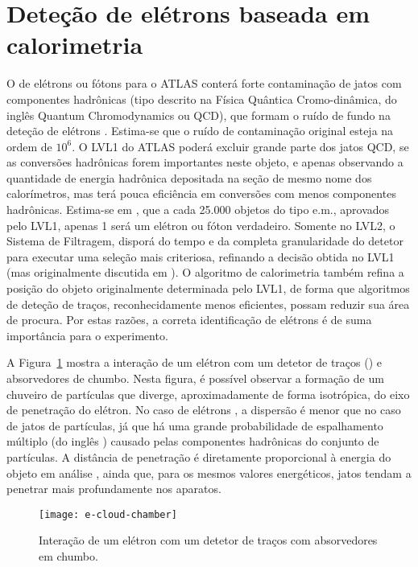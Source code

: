 \section{Deteção de elétrons baseada em calorimetria}
\label{sec:e-detection}

O  de elétrons ou fótons para o ATLAS conterá forte contaminação
de jatos com componentes hadrônicas (tipo descrito na Física Quântica
Cromo-dinâmica, do inglês Quantum Chromodynamics ou QCD), que formam o ruído
de fundo na deteção de elétrons \cite{nevski-calor-1992}. Estima-se que o
ruído de contaminação original esteja na ordem de $10^6$. O LVL1 do ATLAS poderá
excluir grande parte dos jatos QCD, se as conversões hadrônicas forem
importantes neste objeto, e apenas observando a quantidade de energia
hadrônica depositada na seção de mesmo nome dos calorímetros, mas terá pouca
eficiência em conversões com menos componentes hadrônicas. Estima-se em
\cite{daqnote00-02}, que a cada 25.000 objetos do tipo e.m., aprovados pelo
LVL1, apenas 1 será um elétron ou fóton verdadeiro. Somente no LVL2, o Sistema
de Filtragem, disporá do tempo e da completa granularidade do detetor para
executar uma seleção mais criteriosa, refinando a decisão obtida no LVL1
\cite{hlt-tdr} (mas originalmente discutida em \cite{ellis-calor-1992}). O
algoritmo de calorimetria também refina a posição do objeto originalmente
determinada pelo LVL1, de forma que algoritmos de deteção de traços,
reconhecidamente menos eficientes, possam reduzir sua área de procura. Por
estas razões, a correta identificação de elétrons é de suma importância para o
experimento.

A Figura~\ref{fig:e-shower} mostra a interação de um elétron com um detetor de
traços () e absorvedores de chumbo. Nesta figura, é
possível observar a formação de um chuveiro de partículas que diverge,
aproximadamente de forma isotrópica, do eixo de penetração do elétron. No caso
de elétrons \cite{wigmans-book}, a dispersão é menor que no caso de jatos de
partículas, já que há uma grande probabilidade de espalhamento múltiplo (do
inglês ) causado pelas componentes hadrônicas do
conjunto de partículas. A distância de penetração é diretamente proporcional à
energia do objeto em análise \cite{leo, knoll}, ainda que, para os mesmos
valores energéticos, jatos tendam a penetrar mais profundamente nos aparatos.

\begin{figure}
\begin{center}
\texttt{[image: e-cloud-chamber]}
\end{center}
\caption{Interação de um elétron com um detetor de traços com absorvedores em
chumbo.} 
\label{fig:e-shower}
\end{figure}

